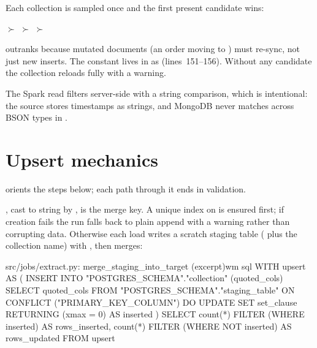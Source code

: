 Each collection is sampled once and the first present candidate wins:

\begin{center}
 $\succ$  $\succ$  $\succ$ 
\end{center}

 outranks  because mutated documents (an order moving to ) must re-sync, not just new inserts. The constant lives in  as  (lines~151--156). Without any candidate the collection reloads fully with a warning.

The Spark read filters server-side with a string comparison, which is intentional: the source stores timestamps as  strings, and MongoDB never matches across BSON types in .


\section{Upsert mechanics}

 orients the steps below; each path through it ends in validation.

, cast to string by , is the merge key. A unique index on  is ensured first; if creation fails the run falls back to plain append with a warning rather than corrupting data. Otherwise each load writes a scratch staging table ( plus the collection name) with , then merges:

\begin{wmlisting}{src/jobs/extract.py: merge\_staging\_into\_target (excerpt)}{wm sql}
WITH upsert AS (
    INSERT INTO "{POSTGRES_SCHEMA}"."{collection}" ({quoted_cols})
    SELECT {quoted_cols} FROM "{POSTGRES_SCHEMA}"."{staging_table}"
    ON CONFLICT ("{PRIMARY_KEY_COLUMN}") DO UPDATE SET {set_clause}
    RETURNING (xmax = 0) AS inserted
)
SELECT
    count(*) FILTER (WHERE inserted)     AS rows_inserted,
    count(*) FILTER (WHERE NOT inserted) AS rows_updated
FROM upsert
\end{wmlisting}

